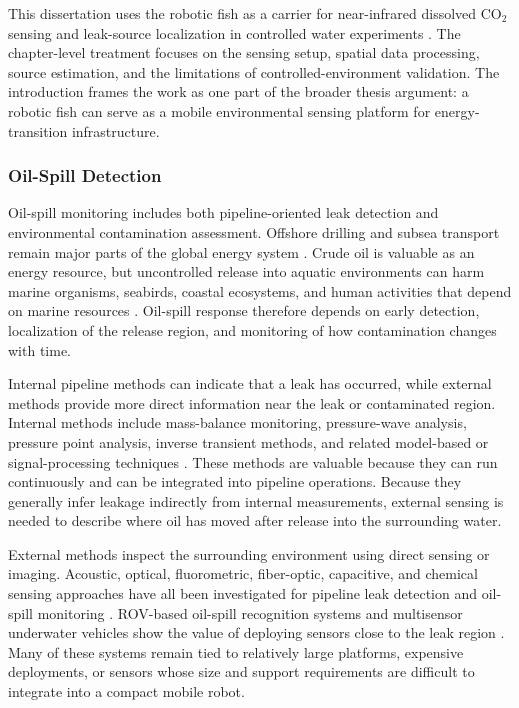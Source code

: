 \documentclass{uhcoethesis}
\begin{document}
This dissertation uses the robotic fish as a carrier for near-infrared dissolved \mbox{CO$_2$} sensing and leak-source localization in controlled water experiments \cite{Masood2025CO2}. The chapter-level treatment focuses on the sensing setup, spatial data processing, source estimation, and the limitations of controlled-environment validation. The introduction frames the work as one part of the broader thesis argument: a robotic fish can serve as a mobile environmental sensing platform for energy-transition infrastructure.

\subsubsection{Oil-Spill Detection}

Oil-spill monitoring includes both pipeline-oriented leak detection and environmental contamination assessment. Offshore drilling and subsea transport remain major parts of the global energy system \cite{HeinrichBoellStiftung2017}. Crude oil is valuable as an energy resource, but uncontrolled release into aquatic environments can harm marine organisms, seabirds, coastal ecosystems, and human activities that depend on marine resources \cite{Almeda2014,Albers1982}. Oil-spill response therefore depends on early detection, localization of the release region, and monitoring of how contamination changes with time.

Internal pipeline methods can indicate that a leak has occurred, while external methods provide more direct information near the leak or contaminated region. Internal methods include mass-balance monitoring, pressure-wave analysis, pressure point analysis, inverse transient methods, and related model-based or signal-processing techniques \cite{Martins2010,Hou2013,Akib2011,Vitkovsky2007,Ostapkowicz2016,Reda2024}. These methods are valuable because they can run continuously and can be integrated into pipeline operations. Because they generally infer leakage indirectly from internal measurements, external sensing is needed to describe where oil has moved after release into the surrounding water.

External methods inspect the surrounding environment using direct sensing or imaging. Acoustic, optical, fluorometric, fiber-optic, capacitive, and chemical sensing approaches have all been investigated for pipeline leak detection and oil-spill monitoring \cite{Jasper2012,Lukonge2020,Adegboye2019,Yao2024,Du2025}. ROV-based oil-spill recognition systems and multisensor underwater vehicles show the value of deploying sensors close to the leak region \cite{Qasem2019,Pocwiardowski2021}. Many of these systems remain tied to relatively large platforms, expensive deployments, or sensors whose size and support requirements are difficult to integrate into a compact mobile robot.
\end{document}
